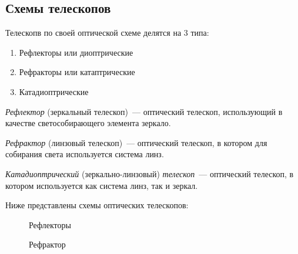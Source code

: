 \subsection{Схемы телескопов}
Телескопв по своей оптической схеме делятся на 3 типа:
\begin{enumerate}
\item Рефлекторы или диоптрические
\item Рефракторы или катаптрические
\item Катадиоптрические
\end{enumerate}

\textit{Рефлектор} (зеркальный телескоп)~---  оптический телескоп, использующий в качестве светособирающего элемента зеркало.

\textit{Рефрактор} (линзовый телескоп)~---  оптический телескоп, в котором для собирания света используется система линз.

\textit{Катадиоптрический} (зеркально-линзовый) \textit{телескоп}~--- оптический телескоп, в котором используется как система линз, так и зеркал.

Ниже представлены схемы оптических телескопов:


\begin{figure}[h]
\begin{minipage}[h]{0.32\linewidth}
\end{minipage}
\hfill
\begin{minipage}[h]{0.32\linewidth}
\end{minipage}
\hfill
\begin{minipage}[h]{0.32\linewidth}
\end{minipage}
\caption{Рефлекторы}
\end{figure}

\centering
\begin{figure}[!h]
\caption{Рефрактор}
\end{figure}
